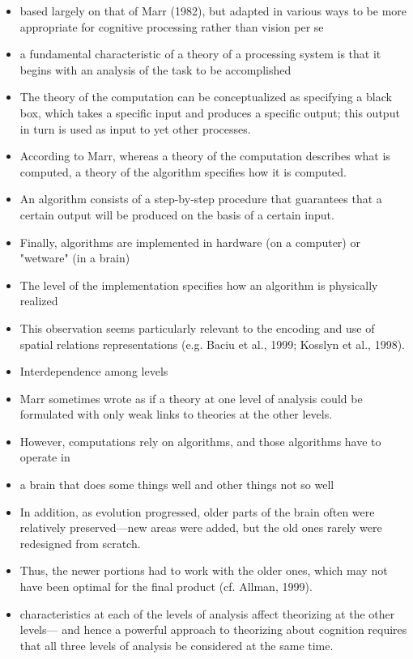\documentclass[12pt]{article}
\begin{document}
\begin{itemize}

\item based largely on that of Marr (1982), but adapted in various ways to be more appropriate for cognitive processing rather than vision per se
\item a fundamental characteristic of a theory of a processing system is that it begins with an analysis of the task to be accomplished
\item The theory of the computation can be conceptualized as specifying a black box, which takes a specific input and produces a specific output; this output in turn is used as input to yet other processes.
\item According to Marr, whereas a theory of the computation describes what is computed, a theory of the algorithm specifies how it is computed.
\item An algorithm consists of a step-by-step procedure that guarantees that a certain output will be produced on the basis of a certain input.
\item Finally, algorithms are implemented in hardware (on a computer) or "wetware" (in a brain)
\item The level of the implementation specifies how an algorithm is physically realized
\item This observation seems particularly relevant to the encoding and use of spatial relations representations (e.g. Baciu et al., 1999; Kosslyn et al., 1998).
\item Interdependence among levels
\item Marr sometimes wrote as if a theory at one level of analysis could be formulated with only weak links to theories at the other levels.
\item However, computations rely on algorithms, and those algorithms have to operate in
\item a brain that does some things well and other things not so well
\item In addition, as evolution progressed, older parts of the brain often were relatively preserved—new areas were added, but the old ones rarely were redesigned from scratch.
\item Thus, the newer portions had to work with the older ones, which may not have been optimal for the final product (cf. Allman, 1999).
\item characteristics at each of the levels of analysis affect theorizing at the other levels— and hence a powerful approach to theorizing about cognition requires that all three levels of analysis be considered at the same time.

\end{itemize}
\end{document}
